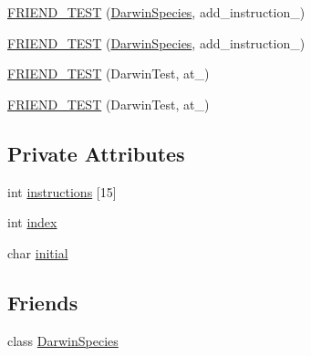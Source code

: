 \begin{DoxyCompactItemize}
\item 
\hyperlink{classSpecies_a14132abc12b274ed3fdd138920551c91}{F\-R\-I\-E\-N\-D\-\_\-\-T\-E\-S\-T} (\hyperlink{classSpecies_af0217fd97a80c28ad384672b45583c0f}{Darwin\-Species}, add\-\_\-instruction\-\_)
\item 
\hyperlink{classSpecies_aa22b7be70debdc2499868c80fc194b2a}{F\-R\-I\-E\-N\-D\-\_\-\-T\-E\-S\-T} (\hyperlink{classSpecies_af0217fd97a80c28ad384672b45583c0f}{Darwin\-Species}, add\-\_\-instruction\-\_)
\item 
\hyperlink{classSpecies_af3d5bf92175ff1b93e591be5475cba65}{F\-R\-I\-E\-N\-D\-\_\-\-T\-E\-S\-T} (Darwin\-Test, at\-\_)
\item 
\hyperlink{classSpecies_aacb6651e3f7afd1d0dc65b0b1d5b38c7}{F\-R\-I\-E\-N\-D\-\_\-\-T\-E\-S\-T} (Darwin\-Test, at\-\_)
\end{DoxyCompactItemize}
\subsection*{Private Attributes}
\begin{DoxyCompactItemize}
\item 
int \hyperlink{classSpecies_a4a713cda9f08caa176cf2da23ec266d0}{instructions} \mbox{[}15\mbox{]}
\item 
int \hyperlink{classSpecies_ad5e7baa27db7470d31a32413447fd28e}{index}
\item 
char \hyperlink{classSpecies_a753163804f97c066bcb02b20ebd77938}{initial}
\end{DoxyCompactItemize}
\subsection*{Friends}
\begin{DoxyCompactItemize}
\item 
class \hyperlink{classSpecies_af0217fd97a80c28ad384672b45583c0f}{Darwin\-Species}
\end{DoxyCompactItemize}


